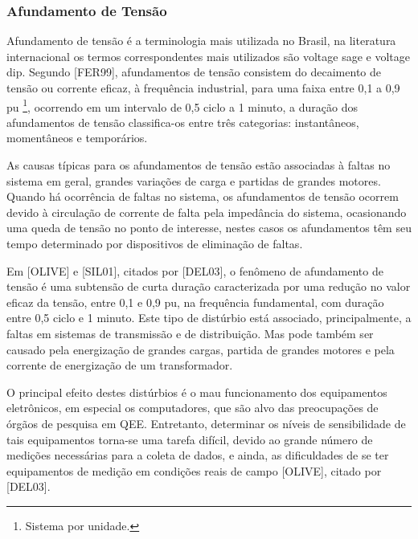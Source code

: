 \subsubsection{Afundamento de Tensão}
\par 
Afundamento de tensão é a terminologia mais utilizada no Brasil, na literatura internacional os termos correspondentes mais utilizados são voltage sage e voltage dip. Segundo [FER99], afundamentos de tensão consistem do decaimento de tensão ou corrente eficaz, à frequência industrial, para uma faixa entre 0,1 a 0,9 pu \footnote{Sistema por unidade.}, ocorrendo em um intervalo de 0,5 ciclo a 1 minuto, a duração dos afundamentos de tensão classifica-os entre três categorias: instantâneos, momentâneos e temporários.
\par 
As causas típicas para os afundamentos de tensão estão associadas à faltas no sistema em geral, grandes variações de carga e partidas de grandes motores. Quando há ocorrência de faltas no sistema, os afundamentos de tensão ocorrem devido à circulação de corrente de falta pela impedância do sistema, ocasionando uma queda de tensão no ponto de interesse, nestes casos os afundamentos têm seu tempo determinado por dispositivos de eliminação de faltas.
\par
Em [OLIVE] e [SIL01], citados por [DEL03], o fenômeno de afundamento de tensão é uma subtensão de curta duração caracterizada por uma redução no valor eficaz da tensão, entre 0,1 e 0,9 pu, na frequência fundamental, com duração entre 0,5 ciclo e 1 minuto. Este tipo de distúrbio está associado, principalmente, a faltas em sistemas de transmissão e de distribuição. Mas pode também ser causado pela energização de grandes cargas, partida de grandes motores e pela corrente de energização de um transformador.
\par
O principal efeito destes distúrbios é o mau funcionamento dos equipamentos eletrônicos, em especial os computadores, que são alvo das preocupações de órgãos de pesquisa em QEE. Entretanto, determinar os níveis de sensibilidade de tais equipamentos torna-se uma tarefa difícil, devido ao grande número de medições necessárias para a coleta de dados, e ainda, as dificuldades de se ter equipamentos de medição em condições reais de campo [OLIVE], citado por [DEL03].

